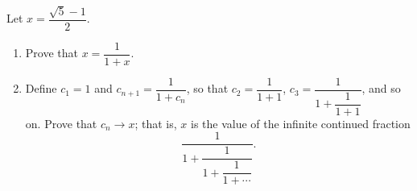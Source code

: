 Let $x=\dfrac{\sqrt5-1}{2}$.
\begin{enumerate}
\item[(a)] Prove that $x=\dfrac{1}{1+x}$.
\item[(b)] Define $c_1=1$ and $c_{n+1}=\dfrac{1}{1+c_n}$, so that $c_2=\dfrac{1}{1+1}$, $c_3=\dfrac{1}{1+\dfrac{1}{1+1}}$, and so on. Prove that $c_n\to x$; that is, $x$ is the value of the infinite continued fraction
\[
\dfrac{1}{1+\dfrac{1}{1+\dfrac{1}{1+\cdots}}} .
\]
\end{enumerate}
